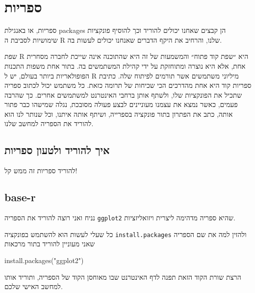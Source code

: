 \documentclass[
]{book}
\newenvironment{Shaded}{\begin{snugshade}}{\end{snugshade}}
\newcommand{\FunctionTok}[1]{\textcolor[rgb]{0.00,0.00,0.00}{#1}}
\newcommand{\NormalTok}[1]{#1}
\newcommand{\StringTok}[1]{\textcolor[rgb]{0.31,0.60,0.02}{#1}}
\begin{document}
\hypertarget{ux5e1ux5e4ux5e8ux5d9ux5d5ux5ea}{%
\chapter{ספריות}\label{ux5e1ux5e4ux5e8ux5d9ux5d5ux5ea}}

ספריות, או באנגילת
packages
הן קבצים שאחנו יכולים להוריד וכך להוסיף פונקציות שימושיות לסביבת ה
R
שלנו, והרחיב את היקף הדברים שאנחנו יכולים לעשות בה.

שפת
R
היא ״שפת קוד פתוח״
והמשמעות של זה היא שהתוכנה אינה שייכת לחברה מסחרית אחת, אלא היא נוצרה ומתוחזקת על ידי קהילת המשתמשים בה.
בתור אחת משפות התכנות הפופולאריות ביותר בעולם, יש ל
R
מיליוני משתמשים אשר תורמים לפיתוח שלה. כתיבת ספריות קוד היא אחת מהדרכים הכי שכיחות של תרומה כזאת. כל משתמש יכול לכתוב ספריה שתכיל את הפונקציות שלו, ולשתף אותן ברחבי האינטרנט למשתמשים אחרים. כך שהרבה פעמים, כאשר נמצא את עצמנו מעוניינים לבצע פעולה מסובכת, נגלה שמישהו כבר פתור אותה, כתב את הפתרון בתור פונקציה בספרייה, ושיתף אותה איתנו, וכל שנותר לנו הוא להוריד את הספריה למחשב שלנו.

\hypertarget{ux5d0ux5d9ux5da-ux5dcux5d4ux5d5ux5e8ux5d9ux5d3-ux5d5ux5dcux5d8ux5e2ux5d5ux5df-ux5e1ux5e4ux5e8ux5d9ux5d5ux5ea}{%
\section{איך להוריד ולטעון ספריות}\label{ux5d0ux5d9ux5da-ux5dcux5d4ux5d5ux5e8ux5d9ux5d3-ux5d5ux5dcux5d8ux5e2ux5d5ux5df-ux5e1ux5e4ux5e8ux5d9ux5d5ux5ea}}

להוריד ספריות זה ממש קל!

\hypertarget{base-r}{%
\section{base-r}\label{base-r}}

נניח ואני רוצה להוריד את הספריה
\texttt{ggplot2}
שהיא ספריה מדהימה ליצרית ויזואליזציות.

כל שעלי לעשות הוא להשתמש בפונקציה
\texttt{install.packages}
ולהזין למה את שם הספריה שאני מעוניין להוריד בתור מרכאות

\begin{Shaded}
\begin{Highlighting}[]
\FunctionTok{install.packages}\NormalTok{(}\StringTok{"ggplot2"}\NormalTok{)}
\end{Highlighting}
\end{Shaded}

הרצת שורת הקוד הזאת תפנה לדף האינטרנט שבו מאוחסן הקוד של הספריה, ותוריד אותו למחשב האישי שלכם.
\end{document}
